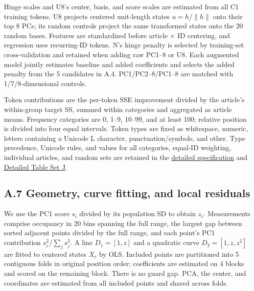 Hinge scales and U8's center, basis, and score scales are estimated from all C1 training tokens. U8 projects centered unit-length states \(u=h/\|h\|\) onto their top 8 PCs; its random controls project the same transformed states onto the 20 random bases. Features are standardized before article × ID centering, and regression uses recurring-ID tokens. N's hinge penalty is selected by training-set cross-validation and retained when adding raw PC1--8 or U8. Each augmented model jointly estimates baseline and added coefficients and selects the added penalty from the 5 candidates in A.4. PC1/PC2--8/PC1--8 are matched with 1/7/8-dimensional controls.

Token contributions are the per-token SSE improvement divided by the article's within-group target SS, summed within categories and aggregated as article means. Frequency categories are 0, 1--9, 10--99, and at least 100; relative position is divided into four equal intervals. Token types are fixed as whitespace, numeric, letters containing a Unicode L character, punctuation/symbols, and other. Type precedence, Unicode rules, and values for all categories, equal-ID weighting, individual articles, and random sets are retained in the \href{https://github.com/metaSATOKEN/manifold_topology_experiment/blob/main/references/METHODS_AND_IDENTIFIERS.md}{detailed specification} and \href{https://github.com/metaSATOKEN/manifold_topology_experiment/blob/main/references/tables/appendix_J.md}{Detailed Table Set J}.

\FloatBarrier

\subsection{A.7 Geometry, curve fitting, and local residuals}\label{a.7-geometry-curve-fitting-and-local-residuals}

We use the PC1 score \(s_i\) divided by its population SD to obtain \(z_i\). Measurements comprise occupancy in 20 bins spanning the full range, the largest gap between sorted adjacent points divided by the full range, and each point's PC1 contribution \(s_i^2/\sum_js_j^2\). A line \(D_1=[1,z]\) and a quadratic curve \(D_2=[1,z,z^2]\) are fitted to centered states \(X_c\) by OLS. Included points are partitioned into 5 contiguous folds in original position order; coefficients are estimated on 4 blocks and scored on the remaining block. There is no guard gap. PCA, the center, and coordinates are estimated from all included points and shared across folds.

